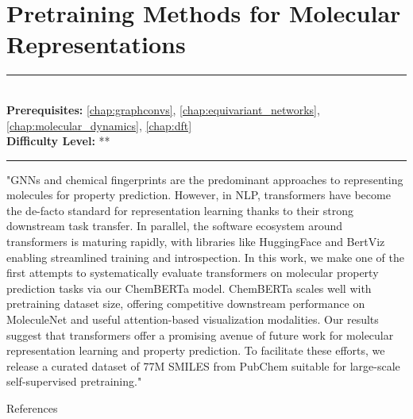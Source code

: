 \documentclass[book.tex]{subfiles}
\begin{document}
\chapter{Pretraining Methods for Molecular Representations}
\label{chap:cormorant}
\noindent\rule{11cm}{0.4pt} \\
\textbf{Prerequisites:} \autoref{chap:graphconvs}, \autoref{chap:equivariant_networks}, \autoref{chap:molecular_dynamics},  \autoref{chap:dft} \\
\textbf{Difficulty Level:} ** \\
\noindent\rule{11cm}{0.4pt}
\vspace{5mm}

"GNNs and chemical fingerprints are the predominant approaches to representing molecules for property prediction. However, in NLP, transformers have become the de-facto standard for representation learning thanks to their strong downstream task transfer. In parallel, the software ecosystem around transformers is maturing rapidly, with libraries like HuggingFace and BertViz enabling streamlined training and introspection. In this work, we make one of the first attempts to systematically evaluate transformers on molecular property prediction tasks via our ChemBERTa model. ChemBERTa scales well with pretraining dataset size, offering competitive downstream performance on MoleculeNet and useful attention-based visualization modalities. Our results suggest that transformers offer a promising avenue of future work for molecular representation learning and property prediction. To facilitate these efforts, we release a curated dataset of 77M SMILES from PubChem suitable for large-scale self-supervised pretraining."

References \cite{chithrananda2020chemberta}
\end{document}
